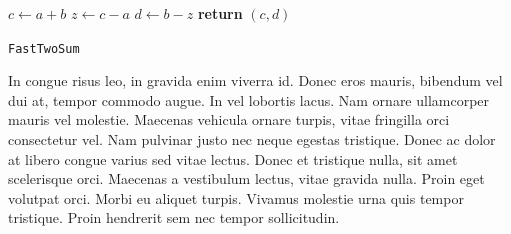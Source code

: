 \documentclass{article}
\begin{document}
\begin{center}
	\begin{minipage}{0.5\linewidth} %
		\begin{algorithm}[H]
			\medskip
			$c \leftarrow a + b$ \;
			$z \leftarrow c - a$ \;
			$d \leftarrow b - z$ \;
			{\bf return} $(c,d)$ \;
			\caption{\texttt{FastTwoSum}} %
			\label{alg:fastTwoSum}   %
		\end{algorithm}
	\end{minipage}
\end{center}

\begin{question}
	In congue risus leo, in gravida enim viverra id. Donec eros mauris, bibendum vel dui at, tempor commodo augue. In vel lobortis lacus. Nam ornare ullamcorper mauris vel molestie. Maecenas vehicula ornare turpis, vitae fringilla orci consectetur vel. Nam pulvinar justo nec neque egestas tristique. Donec ac dolor at libero congue varius sed vitae lectus. Donec et tristique nulla, sit amet scelerisque orci. Maecenas a vestibulum lectus, vitae gravida nulla. Proin eget volutpat orci. Morbi eu aliquet turpis. Vivamus molestie urna quis tempor tristique. Proin hendrerit sem nec tempor sollicitudin.
\end{question}

\end{document}
